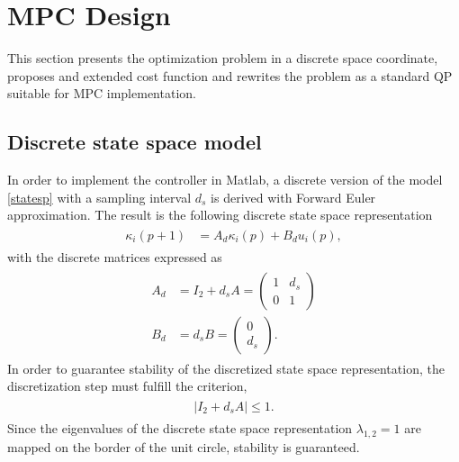 \documentclass[letterpaper,10pt,conference]{ieeeconf}
\begin{document}
\section{MPC Design} \label{sec:MPC}
This section presents the optimization problem in a discrete space coordinate, proposes and extended cost function and rewrites the problem as a standard QP suitable for MPC implementation.
\subsection{Discrete state space model}
In order to implement the controller in Matlab, a discrete version of the model \eqref{statesp} with a sampling interval $d_s$ is derived with Forward Euler approximation. The result is the following discrete state space representation
\begin{align}
\label{eq:model}
\begin{split}
\kappa_i(p+1) &= A_d \kappa_i(p) + B_d u_i(p),
\end{split}
\end{align}
with the discrete matrices expressed as
\begin{align}
\label{eq:model}
\begin{split}
    A_d &= I_2 + d_sA = \begin{pmatrix}
        1&d_s\\
        0&1
    \end{pmatrix}\\
B_d &= d_sB = \begin{pmatrix}
    0\\
    d_s
\end{pmatrix}.
\end{split}
\end{align}
In order to guarantee stability of the discretized state space representation, the discretization step must fulfill the criterion,
\begin{align}
    \label{eq:discstab}
    \begin{split}
        |I_2 + d_s A| \leq 1.
    \end{split}
\end{align}
Since the eigenvalues of the discrete state space representation $\lambda_{1,2}=1$ are mapped on the border of the unit circle, stability is guaranteed.
\end{document}
